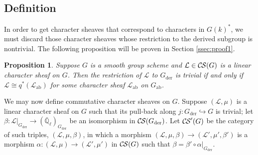 \documentclass[10pt]{amsart}
\theoremstyle{plain}
\newtheorem{proposition}[theorem]{Proposition}
\theoremstyle{definition}
\newcommand{\EE}{\mathbb{\bar Q}_\ell}
\newcommand{\der}{_{\operatorname{der}}}
\newcommand{\ab}{_{\operatorname{ab}}}
\newcommand{\cs}[1]{{\mathcal{#1}}}
\newcommand{\CS}{{\mathcal{C\hskip-0.8pt S}}}
\begin{document}
\subsection{Definition}\label{ssec:noncomdef}

In order to get character sheaves that correspond to characters in $G(k)^*$, we must discard those
character sheaves whose restriction to the derived subgroup is nontrivial.
The following proposition will be proven in Section \ref{ssec:proof1}.
\begin{proposition} \label{prop:Gder_triv}
Suppose $G$ is a smooth group scheme and $\cs{L} \in \CS(G)$ is a linear character sheaf on $G$.
Then the restriction of $\cs{L}$ to $G\der$ is trivial if and only if $\cs{L} \cong q^*(\cs{L}\ab)$ for some
character sheaf $\cs{L}\ab$ on $G\ab$.
\end{proposition}

We may now define commutative character sheaves on $G$.
%
Suppose $(\cs{L},\mu)$ is a linear character sheaf on $G$ such that its pull-back along
$j: G\der \hookrightarrow G$ is trivial;
let $\beta : \cs{L}\vert_{G\der} \to (\EE)_{G\der}$ be an isomorphism in $\CS(G\der)$.
Let $\CS'(G)$ be the category of such triples, $(\cs{L},\mu,\beta)$, in which a morphism $(\cs{L},\mu,\beta)\to (\cs{L}',\mu',\beta')$ is a morphism $\alpha : (\cs{L},\mu)\to (\cs{L}',\mu')$ in $\CS(G)$ such that $\beta = \beta' \circ \alpha\vert_{G\der}$.
%
\end{document}
